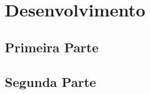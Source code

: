\chapter{Desenvolvimento}

\blindtext 

\section[Parte1]{Primeira Parte}

\blindtext

\blindtext[2]

\blindtext[3]

\section[Parte2]{Segunda Parte}

\blindtext

\blindtext[2]

\blindtext

